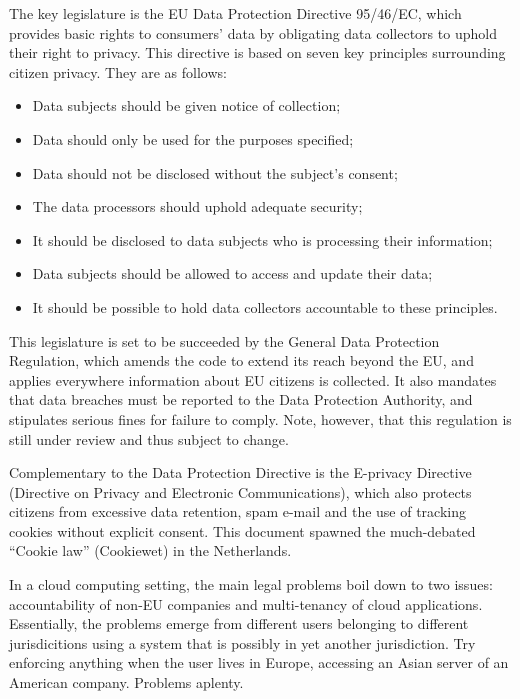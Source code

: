 \documentclass[11pt]{article}
\begin{document}
The key legislature is the EU Data Protection Directive 95/46/EC, which provides basic rights to consumers' data by obligating data collectors to uphold their right to privacy. \cite{directive199595}
This directive is based on seven key principles surrounding citizen privacy.
They are as follows:
\begin{itemize}
\item Data subjects should be given notice of collection;
\item Data should only be used for the purposes specified;
\item Data should not be disclosed without the subject's consent;
\item The data processors should uphold adequate security;
\item It should be disclosed to data subjects who is processing their information;
\item Data subjects should be allowed to access and update their data;
\item It should be possible to hold data collectors accountable to these principles.
\end{itemize}

This legislature is set to be succeeded by the General Data Protection Regulation, which amends the code to extend its reach beyond the EU, and applies everywhere information about EU citizens is collected.
It also mandates that data breaches must be reported to the Data Protection Authority, and stipulates serious fines for failure to comply.
Note, however, that this regulation is still under review and thus subject to change.


Complementary to the Data Protection Directive is the E-privacy Directive (Directive on Privacy and Electronic Communications), which also protects citizens from excessive data retention, spam e-mail and the use of tracking cookies without explicit consent.
This document spawned the much-debated ``Cookie law'' (Cookiewet) in the Netherlands.

In a cloud computing setting, the main legal problems boil down to two issues: accountability of non-EU companies and multi-tenancy of cloud applications. Essentially, the problems emerge from different users belonging to different jurisdicitions using a system that is possibly in yet another jurisdiction. Try enforcing anything when the user lives in Europe, accessing an Asian server of an American company. Problems aplenty.
\end{document}
